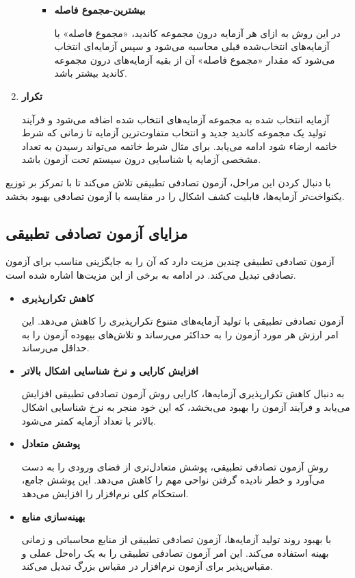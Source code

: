 \begin{enumerate}
\begin{itemize}
\begin{itemize}
			\item \textbf{بیشترین-مجموع فاصله}
			 
			در این روش \cite{zhou2021cost} به ازای هر آزمایه درون مجموعه کاندید، «مجموع فاصله» با آزمایه‌های انتخاب‌شده قبلی محاسبه می‌شود و سپس آزمایه‌ای انتخاب می‌شود که مقدار «مجموع فاصله» آن از بقیه آزمایه‌های درون مجموعه کاندید بیشتر باشد.
		\end{itemize}
		
	\end{itemize}
	
	\item \textbf{تکرار}
	
	 آزمایه انتخاب شده به مجموعه آزمایه‌های انتخاب شده اضافه می‌شود و فرآیند تولید یک مجموعه کاندید جدید و انتخاب متفاوت‌ترین آزمایه تا زمانی که شرط خاتمه ارضاء شود ادامه می‌یابد. برای مثال شرط خاتمه می‌تواند رسیدن به تعداد مشخصی آزمایه یا شناسایی درون سیستم تحت آزمون باشد\cite{huang2019survey}.

\end{enumerate}
با دنبال کردن این مراحل، آزمون تصادفی تطبیقی تلاش می‌کند تا با تمرکز بر توزیع یکنواخت‌تر آزمایه‌ها، قابلیت کشف اشکال را در مقایسه با آزمون تصادفی بهبود بخشد.

\subsection{مزایای آزمون تصادفی تطبیقی}
آزمون تصادفی تطبیقی چندین مزیت دارد که آن را به جایگزینی مناسب برای آزمون تصادفی تبدیل می‌کند\cite{johansson2023comparison}. در ادامه به برخی از این مزیت‌ها اشاره شده است.
\begin{itemize}
	\item \textbf{کاهش تکرارپذیری}
	
	 آزمون تصادفی تطبیقی با تولید آزمایه‌های متنوع تکرارپذیری را کاهش می‌دهد. این امر ارزش هر مورد آزمون را به حداکثر می‌رساند و تلاش‌های بیهوده آزمون را به حداقل می‌رساند.
	\item \textbf{افزایش کارایی و نرخ شناسایی اشکال بالاتر}‌ 
	
	به دنبال کاهش تکرارپذیری آزمایه‌ها، کارایی روش آزمون تصادفی تطبیقی افزایش می‌یابد و فرآیند آزمون را بهبود می‌بخشد، که این خود منجر به نرخ شناسایی اشکال بالاتر با تعداد آزمایه کمتر می‌شود.
	\item \textbf{پوشش متعادل}
	
	 روش آزمون تصادفی تطبیقی، پوشش متعادل‌تری از فضای ورودی را به دست می‌آورد و خطر نادیده گرفتن نواحی مهم را کاهش می‌دهد. این پوشش جامع، استحکام کلی نرم‌افزار را افزایش می‌دهد.
	\item \textbf{بهینه‌سازی منابع}
	
	 با بهبود روند تولید آزمایه‌ها، آزمون تصادفی تطبیقی از منابع محاسباتی و زمانی بهینه استفاده می‌کند. این امر آزمون تصادفی تطبیقی را به یک راه‌حل عملی و مقیاس‌پذیر برای آزمون نرم‌افزار در مقیاس بزرگ تبدیل می‌کند.
\end{itemize}

